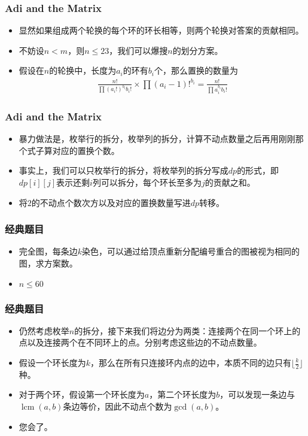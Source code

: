 \documentclass{beamer}
\begin{document}
\begin{frame}
    \frametitle{Adi and the Matrix}
    \begin{itemize}
        \item 显然如果组成两个轮换的每个环的环长相等，则两个轮换对答案的贡献相同。
        \item 不妨设$n < m$，则$n\leq 23$，我们可以爆搜$n$的划分方案。
        \item 假设在$n$的轮换中，长度为$a_i$的环有$b_i$个，那么置换的数量为
        $$\begin{aligned}
            \frac{n!}{\prod (a_i!)^{b_i}b_i!}\times \prod (a_i - 1)!^{b_i} = \frac{n!}{\prod a_i^{b_i}b_i!}
        \end{aligned}$$
    \end{itemize}
\end{frame}

\begin{frame}
    \frametitle{Adi and the Matrix}
    \begin{itemize}
        \item 暴力做法是，枚举行的拆分，枚举列的拆分，计算不动点数量之后再用刚刚那个式子算对应的置换个数。
        \item 事实上，我们可以只枚举行的拆分，将枚举列的拆分写成$dp$的形式，即$dp[i][j]$表示还剩$i$列可以拆分，每个环长至多为$j$的贡献之和。
        \item 将$2$的不动点个数次方以及对应的置换数量写进$dp$转移。
    \end{itemize}
\end{frame}

\begin{frame}
    \frametitle{经典题目}
    \begin{itemize}
        \item 完全图，每条边$k$染色，可以通过给顶点重新分配编号重合的图被视为相同的图，求方案数。
        \item $n\leq 60$
    \end{itemize}
\end{frame}

\begin{frame}
    \frametitle{经典题目}
    \begin{itemize}
        \item 仍然考虑枚举$n$的拆分，接下来我们将边分为两类：连接两个在同一个环上的点以及连接两个在不同环上的点。分别考虑这些边的不动点数量。
        \item 假设一个环长度为$k$，那么在所有只连接环内点的边中，本质不同的边只有$\lfloor\frac k2\rfloor$种。
        \item 对于两个环，假设第一个环长度为$a$，第二个环长度为$b$，可以发现一条边与$\operatorname{lcm}(a, b)$条边等价，因此不动点个数为$\gcd(a, b)$。
        \item 您会了。
    \end{itemize}
\end{frame}
\end{document}
